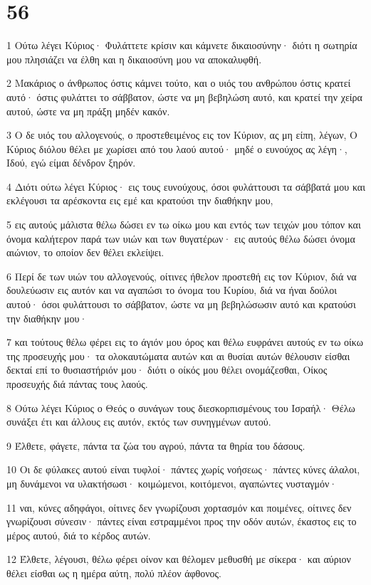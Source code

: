 \chapter{56}

\par 1 Ούτω λέγει Κύριος· Φυλάττετε κρίσιν και κάμνετε δικαιοσύνην· διότι η σωτηρία μου πλησιάζει να έλθη και η δικαιοσύνη μου να αποκαλυφθή.
\par 2 Μακάριος ο άνθρωπος όστις κάμνει τούτο, και ο υιός του ανθρώπου όστις κρατεί αυτό· όστις φυλάττει το σάββατον, ώστε να μη βεβηλώση αυτό, και κρατεί την χείρα αυτού, ώστε να μη πράξη μηδέν κακόν.
\par 3 Ο δε υιός του αλλογενούς, ο προστεθειμένος εις τον Κύριον, ας μη είπη, λέγων, Ο Κύριος διόλου θέλει με χωρίσει από του λαού αυτού· μηδέ ο ευνούχος ας λέγη·, Ιδού, εγώ είμαι δένδρον ξηρόν.
\par 4 Διότι ούτω λέγει Κύριος· εις τους ευνούχους, όσοι φυλάττουσι τα σάββατά μου και εκλέγουσι τα αρέσκοντα εις εμέ και κρατούσι την διαθήκην μου,
\par 5 εις αυτούς μάλιστα θέλω δώσει εν τω οίκω μου και εντός των τειχών μου τόπον και όνομα καλήτερον παρά των υιών και των θυγατέρων· εις αυτούς θέλω δώσει όνομα αιώνιον, το οποίον δεν θέλει εκλείψει.
\par 6 Περί δε των υιών του αλλογενούς, οίτινες ήθελον προστεθή εις τον Κύριον, διά να δουλεύωσιν εις αυτόν και να αγαπώσι το όνομα του Κυρίου, διά να ήναι δούλοι αυτού· όσοι φυλάττουσι το σάββατον, ώστε να μη βεβηλώσωσιν αυτό και κρατούσι την διαθήκην μου·
\par 7 και τούτους θέλω φέρει εις το άγιόν μου όρος και θέλω ευφράνει αυτούς εν τω οίκω της προσευχής μου· τα ολοκαυτώματα αυτών και αι θυσίαι αυτών θέλουσιν είσθαι δεκταί επί το θυσιαστήριόν μου· διότι ο οίκός μου θέλει ονομάζεσθαι, Οίκος προσευχής διά πάντας τους λαούς.
\par 8 Ούτω λέγει Κύριος ο Θεός ο συνάγων τους διεσκορπισμένους του Ισραήλ· Θέλω συνάξει έτι και άλλους εις αυτόν, εκτός των συνηγμένων αυτού.
\par 9 Έλθετε, φάγετε, πάντα τα ζώα του αγρού, πάντα τα θηρία του δάσους.
\par 10 Οι δε φύλακες αυτού είναι τυφλοί· πάντες χωρίς νοήσεως· πάντες κύνες άλαλοι, μη δυνάμενοι να υλακτήσωσι· κοιμώμενοι, κοιτόμενοι, αγαπώντες νυσταγμόν·
\par 11 ναι, κύνες αδηφάγοι, οίτινες δεν γνωρίζουσι χορτασμόν και ποιμένες, οίτινες δεν γνωρίζουσι σύνεσιν· πάντες είναι εστραμμένοι προς την οδόν αυτών, έκαστος εις το μέρος αυτού, διά το κέρδος αυτών.
\par 12 Έλθετε, λέγουσι, θέλω φέρει οίνον και θέλομεν μεθυσθή με σίκερα· και αύριον θέλει είσθαι ως η ημέρα αύτη, πολύ πλέον άφθονος.

